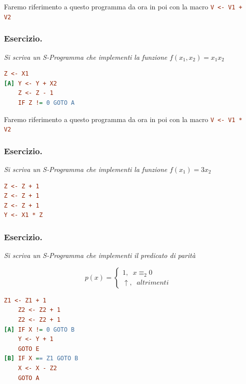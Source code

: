 Faremo riferimento a questo programma da ora in poi con la macro \lstinline[language=ini]{V <- V1 + V2}

\newpage

\subsubsection*{Esercizio.} \textit{Si scriva un S-Programma che implementi la funzione \(f(x_1,x_2)=x_1x_2\)}

\begin{lstlisting}[language=ini, label={Funzione Prodotto},  caption=Funzione prodotto]
    Z <- X1
[A] Y <- Y + X2
    Z <- Z - 1
    IF Z != 0 GOTO A
\end{lstlisting}

Faremo riferimento a questo programma da ora in poi con la macro \lstinline[language=ini]{V <- V1 * V2}

\subsubsection*{Esercizio.} \textit{Si scriva un S-Programma che implementi la funzione \(f(x_1)=3x_2\)}

\begin{lstlisting}[language=ini, label={Funzione Prodotto con Costante},  caption=Funzione prodotto con costante]
Z <- Z + 1
Z <- Z + 1
Z <- Z + 1
Y <- X1 * Z
\end{lstlisting}

\subsubsection*{Esercizio.} \textit{Si scriva un S-Programma che implementi il predicato di parità}

\begin{equation}
  p(x)= \begin{cases}
        1, \;\; x\equiv_{2}0\\
        \uparrow, \;\; altrimenti
        \end{cases}
\end{equation}

\begin{lstlisting}[language=ini, label={Predicato Pari Dispari},  caption=Predicato di Parità]
    Z1 <- Z1 + 1
    Z2 <- Z2 + 1
    Z2 <- Z2 + 1
[A] IF X != 0 GOTO B
    Y <- Y + 1
    GOTO E
[B] IF X == Z1 GOTO B
    X <- X - Z2
    GOTO A
\end{lstlisting}

